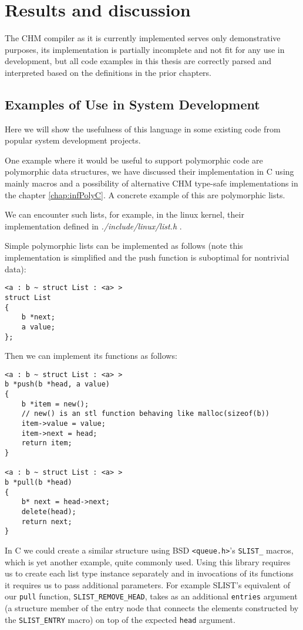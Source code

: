 
\chapter{Results and discussion}

The CHM compiler as it is currently implemented serves only demonstrative purposes, its implementation is partially incomplete and not fit for any use in development, but all code examples in this thesis are correctly parsed and interpreted based on the definitions in the prior chapters.

\section{Examples of Use in System Development}

Here we will show the usefulness of this language in some existing code from popular system development projects.

One example where it would be useful to support polymorphic code are polymorphic data structures, we have discussed their implementation in C using mainly macros and a possibility of alternative CHM type-safe implementations in the chapter \ref{chap:infPolyC}. A concrete example of this are polymorphic lists.

We can encounter such lists, for example, in the linux kernel, their implementation defined in \emph{./include/linux/list.h} \cite{torvalds2018linux}.

Simple polymorphic lists can be implemented as follows (note this implementation is simplified and the push function is suboptimal for nontrivial data):

\begin{lstlisting}
<a : b ~ struct List : <a> >
struct List
{
    b *next;
    a value;
};
\end{lstlisting}

Then we can implement its functions as follows:

\begin{lstlisting}
<a : b ~ struct List : <a> >
b *push(b *head, a value)
{
    b *item = new();
    // new() is an stl function behaving like malloc(sizeof(b))
    item->value = value;
    item->next = head;
    return item;
}

<a : b ~ struct List : <a> >
b *pull(b *head)
{
    b* next = head->next;
    delete(head);
    return next;
}
\end{lstlisting}

In C we could create a similar structure using BSD \lstinline{<queue.h>}'s \cite{pages2007queue} \lstinline{SLIST_} macros, which is yet another example, quite commonly used. Using this library requires us to create each list type instance separately and in invocations of its functions it requires us to pass additional parameters. For example SLIST's equivalent of our \lstinline{pull} function, \lstinline{SLIST_REMOVE_HEAD}, takes as an additional \lstinline{entries} argument (a structure member of the entry node that connects the elements constructed by the \lstinline{SLIST_ENTRY} macro) on top of the expected \lstinline{head} argument.

